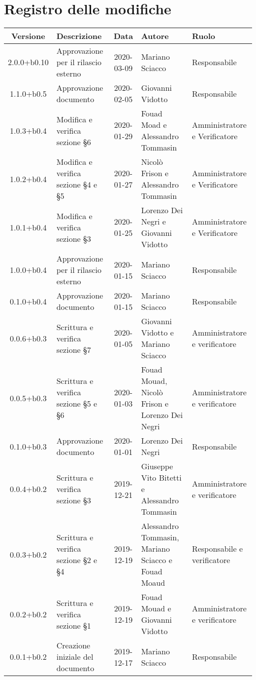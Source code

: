 \section*{Registro delle modifiche}

\begin{center}
	\begin{longtable}{|c|p{3.5cm}|c|p{3cm}|p{3cm}|}
	\hline
	\rowcolor{lighter-grayer}
	\textbf{Versione} & \textbf{Descrizione} & \textbf{Data} & \textbf{Autore} & \textbf{Ruolo} \\
	\hline
	\endfirsthead

	2.0.0+b0.10 & Approvazione per il rilascio esterno & 2020-03-09 & Mariano Sciacco & Responsabile \\
	\hline
	1.1.0+b0.5 & Approvazione documento & 2020-02-05 & Giovanni Vidotto & Responsabile \\
	\hline 
	1.0.3+b0.4 & Modifica e verifica sezione \S6 & 2020-01-29 & Fouad Moad e Alessandro Tommasin & Amministratore e Verificatore \\
	\hline
	1.0.2+b0.4 & Modifica e verifica sezione \S4 e \S5 & 2020-01-27 & Nicolò Frison e Alessandro Tommasin & Amministratore e Verificatore \\
	\hline
	1.0.1+b0.4 & Modifica e verifica sezione \S3 & 2020-01-25 & Lorenzo Dei Negri e Giovanni Vidotto & Amministratore e Verificatore \\
	\hline
	1.0.0+b0.4 & Approvazione per il rilascio esterno & 2020-01-15 & Mariano Sciacco & Responsabile \\
	\hline
	0.1.0+b0.4 & Approvazione documento & 2020-01-15 & Mariano Sciacco & Responsabile \\
	\hline 
	0.0.6+b0.3 & Scrittura e verifica sezione \S7  & 2020-01-05 & Giovanni Vidotto e Mariano Sciacco & Amministratore e verificatore \\
	\hline 
	0.0.5+b0.3 & Scrittura e verifica sezione \S5 e \S6  & 2020-01-03 & Fouad Mouad, Nicolò Frison e Lorenzo Dei Negri & Amministratore e verificatore \\
	\hline
	0.1.0+b0.3 & Approvazione documento & 2020-01-01 & Lorenzo Dei Negri & Responsabile \\ 
	\hline
	0.0.4+b0.2 & Scrittura e verifica sezione \S3 & 2019-12-21 & Giuseppe Vito Bitetti e Alessandro Tommasin & Amministratore e verificatore \\
	\hline 
	0.0.3+b0.2 & Scrittura e verifica sezione \S2 e \S4 & 2019-12-19 & Alessandro Tommasin, Mariano Sciacco e Fouad Moaud & Responsabile e verificatore \\
	\hline 
	0.0.2+b0.2 & Scrittura e verifica sezione \S1 & 2019-12-19 & Fouad Mouad e Giovanni Vidotto & Amministratore e verificatore \\
	\hline 
	0.0.1+b0.2 & Creazione iniziale del documento & 2019-12-17 & Mariano Sciacco & Responsabile \\
	\hline
	

	\end{longtable}
\end{center}